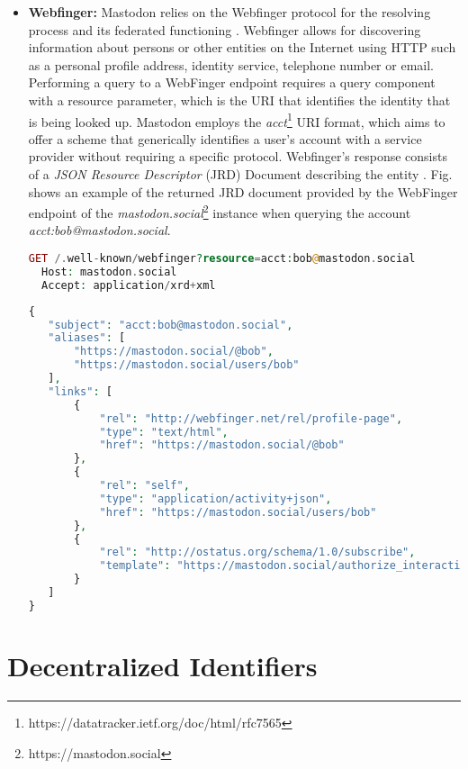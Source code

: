 \begin{itemize}
\item \textbf{Webfinger:}
Mastodon relies on the Webfinger protocol for the resolving process and its federated functioning \cite{rochko_2020}. Webfinger allows for discovering information about persons or other entities on the Internet using HTTP such as a personal profile address, identity service, telephone number or email. Performing a query to a WebFinger endpoint requires a query component with a resource parameter, which is the URI that identifies the identity that is being looked up. Mastodon employs the \emph{acct}\footnote{https://datatracker.ietf.org/doc/html/rfc7565} URI format, which aims to offer a scheme that generically identifies a user's account with a service provider without requiring a specific protocol. Webfinger's response consists of a \emph{JSON Resource Descriptor} (JRD) Document describing the entity \cite{jones_salgueiro_jones_smarr_2013}. Fig. \label{Webfinger response from mastodon.social} shows an example of the returned JRD document provided by the WebFinger endpoint of the \emph{mastodon.social}\footnote{https://mastodon.social} instance when querying the account \emph{acct:bob@mastodon.social}.

\lstset{style=JSONStyle}
\begin{lstlisting}[language=PHP, caption=HTTP request to Webfinger endpoint, label=Webfinger request, float=h]
  GET /.well-known/webfinger?resource=acct:bob@mastodon.social
  Host: mastodon.social
  Accept: application/xrd+xml
\end{lstlisting}

\lstset{style=JSONStyle}
\begin{lstlisting}[language=PHP, caption=Webfinger response, label=Webfinger response from mastodon.social, float=h]
{
   "subject": "acct:bob@mastodon.social",
   "aliases": [
       "https://mastodon.social/@bob",
       "https://mastodon.social/users/bob"
   ],
   "links": [
       {
           "rel": "http://webfinger.net/rel/profile-page",
           "type": "text/html",
           "href": "https://mastodon.social/@bob"
       },
       {
           "rel": "self",
           "type": "application/activity+json",
           "href": "https://mastodon.social/users/bob"
       },
       {
           "rel": "http://ostatus.org/schema/1.0/subscribe",
           "template": "https://mastodon.social/authorize_interaction?uri={uri}"
       }
   ]
}
\end{lstlisting}
\end{itemize}

\section{Decentralized Identifiers} \label{section:dids}

